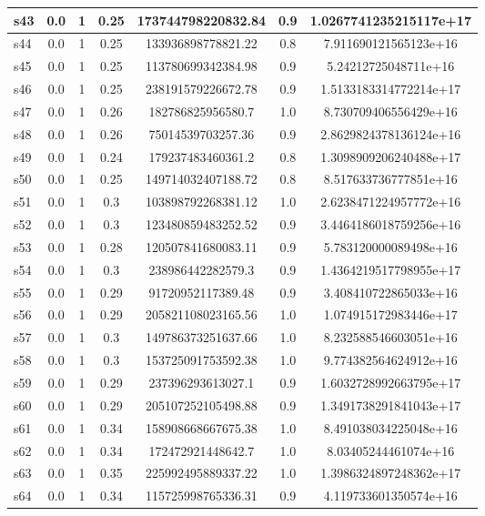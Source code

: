 \documentclass{article}
\begin{document}
\begin{tabular}{|l|c|c|c|c|c|c|}
\hline
s43 &0.0 & 1 & 0.25 & 173744798220832.84 & 0.9 & 1.0267741235215117e+17\\
\hline
s44 &0.0 & 1 & 0.25 & 133936898778821.22 & 0.8 & 7.911690121565123e+16\\
\hline
s45 &0.0 & 1 & 0.25 & 113780699342384.98 & 0.9 & 5.24212725048711e+16\\
\hline
s46 &0.0 & 1 & 0.25 & 238191579226672.78 & 0.9 & 1.5133183314772214e+17\\
\hline
s47 &0.0 & 1 & 0.26 & 182786825956580.7 & 1.0 & 8.730709406556429e+16\\
\hline
s48 &0.0 & 1 & 0.26 & 75014539703257.36 & 0.9 & 2.8629824378136124e+16\\
\hline
s49 &0.0 & 1 & 0.24 & 179237483460361.2 & 0.8 & 1.3098909206240488e+17\\
\hline
s50 &0.0 & 1 & 0.25 & 149714032407188.72 & 0.8 & 8.517633736777851e+16\\
\hline
s51 &0.0 & 1 & 0.3 & 103898792268381.12 & 1.0 & 2.6238471224957772e+16\\
\hline
s52 &0.0 & 1 & 0.3 & 123480859483252.52 & 0.9 & 3.4464186018759256e+16\\
\hline
s53 &0.0 & 1 & 0.28 & 120507841680083.11 & 0.9 & 5.783120000089498e+16\\
\hline
s54 &0.0 & 1 & 0.3 & 238986442282579.3 & 0.9 & 1.4364219517798955e+17\\
\hline
s55 &0.0 & 1 & 0.29 & 91720952117389.48 & 0.9 & 3.408410722865033e+16\\
\hline
s56 &0.0 & 1 & 0.29 & 205821108023165.56 & 1.0 & 1.074915172983446e+17\\
\hline
s57 &0.0 & 1 & 0.3 & 149786373251637.66 & 1.0 & 8.232588546603051e+16\\
\hline
s58 &0.0 & 1 & 0.3 & 153725091753592.38 & 1.0 & 9.774382564624912e+16\\
\hline
s59 &0.0 & 1 & 0.29 & 237396293613027.1 & 0.9 & 1.6032728992663795e+17\\
\hline
s60 &0.0 & 1 & 0.29 & 205107252105498.88 & 0.9 & 1.3491738291841043e+17\\
\hline
s61 &0.0 & 1 & 0.34 & 158908668667675.38 & 1.0 & 8.491038034225048e+16\\
\hline
s62 &0.0 & 1 & 0.34 & 172472921448642.7 & 1.0 & 8.03405244461074e+16\\
\hline
s63 &0.0 & 1 & 0.35 & 225992495889337.22 & 1.0 & 1.3986324897248362e+17\\
\hline
s64 &0.0 & 1 & 0.34 & 115725998765336.31 & 0.9 & 4.119733601350574e+16\\

\end{tabular}
\end{document}
